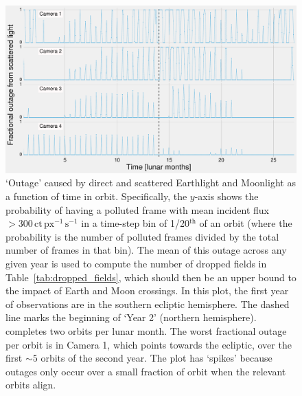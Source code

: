 \begin{figure}[!t]
	\centering
	\includegraphics[angle=90,width=1.05\textwidth]{figures/outage_earth_moon_primary_panels.pdf}
	\caption{`Outage' caused by direct and scattered Earthlight and Moonlight 
	as a function of time in \tesss orbit.
	Specifically, the $y$-axis shows the probability of having a polluted frame 
	with mean incident flux $>300\,\mathrm{ct\,px^{-1}\,s^{-1}}$ in a time-step 
	bin of 1/20$^\mathrm{th}$ of an 
	orbit (where the probability is the number of polluted frames divided by 
	the total number of frames in that bin).
	The mean of this outage across any given year is used to compute the number of dropped fields in Table~\protect\ref{tab:dropped_fields}, which should then be an upper bound to the impact of Earth and Moon crossings.
	In this plot, the first year of observations are in the southern ecliptic 
	hemisphere. The dashed line marks the beginning of `Year 2' (northern 
	hemisphere). 
	\tess completes two orbits per lunar month.
	The worst fractional outage per orbit is in Camera 1, which 
	points towards the ecliptic, over the first $\sim\!5$ orbits of the second 
	year.
	The plot has `spikes' because outages only occur over a small 
	fraction of \tesss orbit when the relevant orbits align.}
	\label{fig:earth_moon_primary}
\end{figure}
